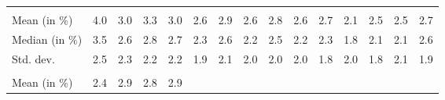 \begin{tabular}{lllllllllllllll}
  \multicolumn{1}{r}{} &
  \multicolumn{1}{r}{} &
  \multicolumn{1}{r}{} &
  \multicolumn{1}{r}{} &
  \multicolumn{1}{r}{} &
  \multicolumn{1}{r}{} &
  \multicolumn{1}{r}{} &
  \multicolumn{1}{r}{} &
  \multicolumn{1}{r}{} &
  \multicolumn{1}{r}{} &
  \multicolumn{1}{r}{} \\
\multicolumn{1}{l}{\hspace{2em}Mean (in $\%$)} &
  \multicolumn{1}{|r}{4.0} &
  \multicolumn{1}{r}{3.0} &
  \multicolumn{1}{r}{3.3} &
  \multicolumn{1}{r}{3.0} &
  \multicolumn{1}{r}{2.6} &
  \multicolumn{1}{r}{2.9} &
  \multicolumn{1}{r}{2.6} &
  \multicolumn{1}{r}{2.8} &
  \multicolumn{1}{r}{2.6} &
  \multicolumn{1}{r}{2.7} &
  \multicolumn{1}{r}{2.1} &
  \multicolumn{1}{r}{2.5} &
  \multicolumn{1}{r}{2.5} &
  \multicolumn{1}{r}{2.7} \\
\multicolumn{1}{l}{\hspace{2em}Median (in $\%$)} &
  \multicolumn{1}{|r}{3.5} &
  \multicolumn{1}{r}{2.6} &
  \multicolumn{1}{r}{2.8} &
  \multicolumn{1}{r}{2.7} &
  \multicolumn{1}{r}{2.3} &
  \multicolumn{1}{r}{2.6} &
  \multicolumn{1}{r}{2.2} &
  \multicolumn{1}{r}{2.5} &
  \multicolumn{1}{r}{2.2} &
  \multicolumn{1}{r}{2.3} &
  \multicolumn{1}{r}{1.8} &
  \multicolumn{1}{r}{2.1} &
  \multicolumn{1}{r}{2.1} &
  \multicolumn{1}{r}{2.6} \\
\multicolumn{1}{l}{\hspace{2em}Std. dev.} &
  \multicolumn{1}{|r}{2.5} &
  \multicolumn{1}{r}{2.3} &
  \multicolumn{1}{r}{2.2} &
  \multicolumn{1}{r}{2.2} &
  \multicolumn{1}{r}{1.9} &
  \multicolumn{1}{r}{2.1} &
  \multicolumn{1}{r}{2.0} &
  \multicolumn{1}{r}{2.0} &
  \multicolumn{1}{r}{2.0} &
  \multicolumn{1}{r}{1.8} &
  \multicolumn{1}{r}{2.0} &
  \multicolumn{1}{r}{1.8} &
  \multicolumn{1}{r}{2.1} &
  \multicolumn{1}{r}{1.9} \\
\multicolumn{1}{l}{\hspace{1em}{\textit{Additive term} ($\widehat{t}/\widetilde{p}$)}} &
  \multicolumn{1}{|r}{} &
  \multicolumn{1}{r}{} &
  \multicolumn{1}{r}{} &
  \multicolumn{1}{r}{} &
  \multicolumn{1}{r}{} &
  \multicolumn{1}{r}{} &
  \multicolumn{1}{r}{} &
  \multicolumn{1}{r}{} &
  \multicolumn{1}{r}{} &
  \multicolumn{1}{r}{} &
  \multicolumn{1}{r}{} &
  \multicolumn{1}{r}{} &
  \multicolumn{1}{r}{} &
  \multicolumn{1}{r}{} \\
\multicolumn{1}{l}{\hspace{2em}Mean (in $\%$)} &
  \multicolumn{1}{|r}{2.4} &
  \multicolumn{1}{r}{2.9} &
  \multicolumn{1}{r}{2.8} &
  \multicolumn{1}{r}{2.9} &

\end{tabular}
